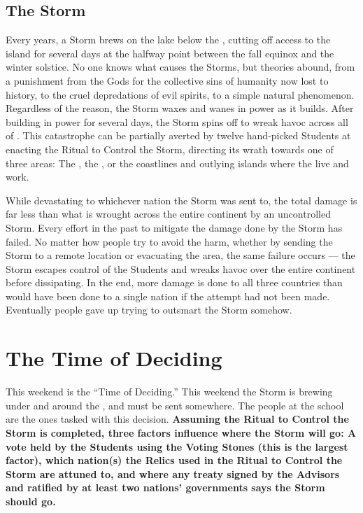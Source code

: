 \documentclass[blue]{GL2020}
\begin{document}
\subsection*{The Storm}
Every \pCycle{} years, a Storm brews on the lake below the \pSc{}, cutting off access to the island for several days at the halfway point between the fall equinox and the winter solstice. No one knows what causes the Storms, but theories abound, from a punishment from the Gods for the collective sins of humanity now lost to history, to the cruel depredations of evil spirits, to a simple natural phenomenon. Regardless of the reason, the Storm waxes and wanes in power as it builds. After building in power for several days, the Storm spins off to wreak havoc across all of \pEarth{}. This catastrophe can be partially averted by twelve hand-picked Students at \pSchool{} enacting the Ritual to Control the Storm, directing its wrath towards one of three areas: The \pFarm{}, the \pTech{}, or the coastlines and outlying islands where the \pShippies{} live and work. 

While devastating to whichever nation the Storm was sent to, the total damage is far less than what is wrought across the entire continent by an uncontrolled Storm. Every effort in the past to mitigate the damage done by the Storm has failed. No matter how people try to avoid the harm, whether by sending the Storm to a remote location or evacuating the area, the same failure occurs — the Storm escapes control of the Students and wreaks havoc over the entire continent before dissipating. In the end, more damage is done to all three countries than would have been done to a single nation if the attempt had not been made. Eventually people gave up trying to outsmart the Storm somehow.

\section*{The Time of Deciding}
This weekend is the ``Time of Deciding.'' This weekend the Storm is brewing under and around the \pSchool{}, and must be sent somewhere. The people at the school are the ones tasked with this decision. \textbf{Assuming the Ritual to Control the Storm is completed, three factors influence where the Storm will go: A vote held by the Students using the Voting Stones (this is the largest factor), which nation(s) the Relics used in the Ritual to Control the Storm are attuned to, and where any treaty signed by the Advisors and ratified by at least two nations’ governments says the Storm should go.} 
\end{document}
